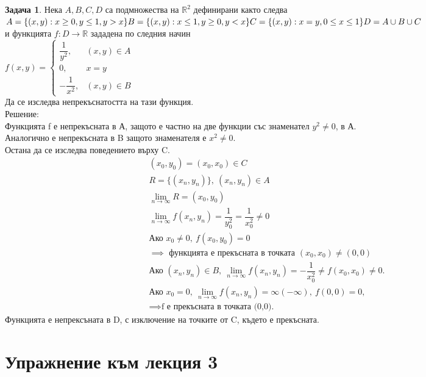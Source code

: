 \documentclass[a4paper,fleqn,12pt]{article}
\theoremstyle{definition}
\newtheorem{task}{Задача}[subsection]
\begin{document}
\begin{task}
Нека $A,B,C,D$ са подмножества на $\mathbb{R}^2$ дефинирани както следва \\
$
A = \{ (x,y): x \geq 0, y \leq 1, y>x \} \\
B = \{ (x,y): x \leq 1, y \geq 0, y<x \} \\
C = \{ (x,y): x = y , 0 \leq x \leq 1 \} \\
D = A \cup B \cup C
$ \\
и функцията $f: D \to \mathbb{R} $ зададена по следния начин \\
$f(x,y) = 
\begin{cases}
\dfrac{1}{y^2}, & (x,y)\in A \\
0, & x = y \\
-\dfrac{1}{x^2}, & (x,y)\in B
\end{cases}$\\ 
Да се изследва непрекъснатостта на тази функция. \\
Решение:\\
Функцията f е непрекъсната в А, защото е частно на две функции със знаменател $y^2\neq 0$, в А.\\
Аналогично е непрекъсната в B защото знаменателя е $x^2 \neq 0$.\\
Остана да се изследва поведението върху C. \\
\begin{gather*}
(x_0,y_0) = (x_0, x_0) \in C \\
R = \{ (x_n , y_n) \},\ (x_n , y_n) \in A \\
\lim\limits_{n \to \infty} R = (x_0, y_0)\\
\lim\limits_{n \to \infty} f(x_n,y_n) = \dfrac{1}{y_0 ^2} = \dfrac{1}{x_0 ^2} \neq 0\\
\text{Ако } x_0 \neq 0, \ f(x_0,y_0) = 0 \\
\implies \text{ функцията е прекъсната в точката } (x_0, x_0) \neq (0,0) \\
\text{Ако } (x_n , y_n) \in B,\ \lim\limits_{n \to \infty} f(x_n,y_n) = - \dfrac{1}{x_0 ^2} \neq f(x_0, x_0) \neq 0. \\
\text{Ако } x_0 = 0,\ \lim\limits_{n \to \infty} f(x_n,y_n) = \infty(-\infty),\ f(0,0) = 0,\\
\implies \text{f е прекъсната в точката (0,0).} 
\end{gather*}
Функцията е непрексъната в D, с изключение на точките от C, където е прекъсната. 
\end{task}

\newpage
\section{Упражнение към лекция 3}
\end{document}
